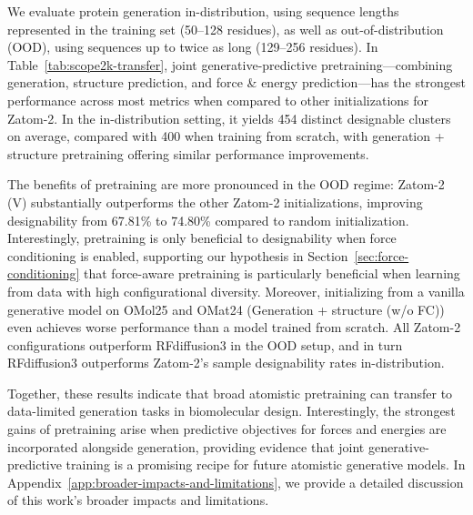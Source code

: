 \documentclass{article} %
\begin{document}
We evaluate protein generation in-distribution, using sequence lengths represented in the training set (50--128 residues), as well as out-of-distribution (OOD), using sequences up to twice as long (129--256 residues). In Table~\ref{tab:scope2k-transfer}, joint generative-predictive pretraining---combining generation, structure prediction, and force \& energy prediction---has the strongest performance across most metrics when compared to other initializations for Zatom-2. In the in-distribution setting, it yields 454 distinct designable clusters on average, compared with 400 when training from scratch, with generation + structure pretraining offering similar performance improvements.

The benefits of pretraining are more pronounced in the OOD regime: Zatom-2 (V) substantially outperforms the other Zatom-2 initializations, improving designability from 67.81\% to 74.80\% compared to random initialization.
Interestingly, pretraining is only beneficial to designability when force conditioning is enabled, supporting our hypothesis in Section~\ref{sec:force-conditioning} that force-aware pretraining is particularly beneficial when learning from data with high configurational diversity. Moreover, initializing from a vanilla generative model on OMol25 and OMat24 (Generation + structure (w/o FC)) even achieves worse performance than a model trained from scratch. All Zatom-2 configurations outperform RFdiffusion3 in the OOD setup, and in turn RFdiffusion3 outperforms Zatom-2's sample designability rates in-distribution.

Together, these results indicate that broad atomistic pretraining can transfer to data-limited generation tasks in biomolecular design. Interestingly, the strongest gains of pretraining arise when predictive objectives for forces and energies are incorporated alongside generation, providing evidence that joint generative-predictive training is a promising recipe for future atomistic generative models. In Appendix~\ref{app:broader-impacts-and-limitations}, we provide a detailed discussion of this work's broader impacts and limitations.
\end{document}
